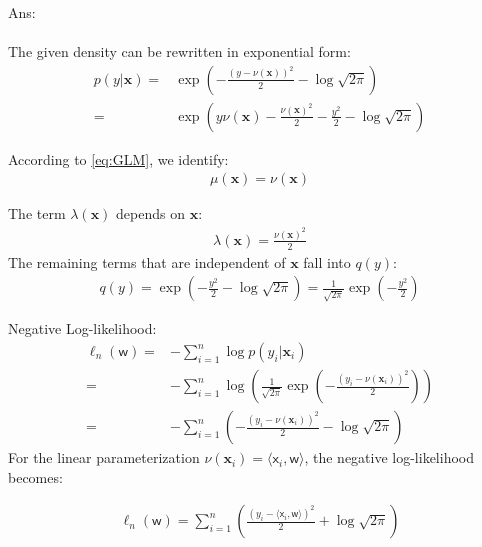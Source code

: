 \documentclass[10pt]{article}
\newcommand{\xv}{\mathbf{x}}
\newcommand{\inner}[2]{\langle #1, #2 \rangle}
\newcommand{\xbs}{\bm{\mathsf{x}}}
\newcommand{\wbs}{\bm{\mathsf{w}}}
\newcommand{\ans}[1]{{\color{orange}\textsf{Ans}: #1}}
\begin{document}
\begin{exercise}
\begin{enumerate}
          \ans\\
          \leavevmode\\
          The given density can be rewritten in exponential form:
          \begin{equation*}
            \begin{aligned}
              p(y | \xv) = & \exp\left(-\frac{(y - \nu(\xv))^2}{2} - \log \sqrt{2\pi}\right)                       \\
              =            & \exp\left(y \nu(\xv) - \frac{\nu(\xv)^2}{2} - \frac{y^2}{2} - \log \sqrt{2\pi}\right)
            \end{aligned}
          \end{equation*}

          According to \eqref{eq:GLM}, we identify:
          \begin{align}
            \boxed{\mu(\xv) = \nu(\xv)}
          \end{align}

          The term $\lambda(\xv)$ depends on $\xv$:
          \begin{align}
            \boxed{\lambda(\xv) = \frac{\nu(\xv)^2}{2} }
          \end{align}
          The remaining terms that are independent of $\xv$ fall into $q(y)$:
          \begin{align}
            \boxed{q(y) = \exp\left(-\frac{y^2}{2}-\log \sqrt{2\pi}\right)=\frac{1}{\sqrt{2\pi}}\exp\left(-\frac{y^2}{2}\right)}
          \end{align}

          Negative Log-likelihood:
          \begin{equation*}
            \begin{aligned}
              \ell_n(\wbs) = & -\sum_{i=1}^n \log p(y_i | \xv_i)                                                                      \\
              =              & -\sum_{i=1}^n \log \left(\frac{1}{\sqrt{2\pi}} \exp\left(-\frac{(y_i - \nu(\xv_i))^2}{2}\right)\right) \\
              =              & -\sum_{i=1}^n \left( -\frac{(y_i - \nu(\xv_i))^2}{2} - \log \sqrt{2\pi} \right)
            \end{aligned}
          \end{equation*}
          For the linear parameterization $\nu(\xv_i) = \inner{\xbs_i}{\wbs}$, the negative log-likelihood becomes:

          \begin{align}
            \boxed{\ell_n(\wbs) = \sum_{i=1}^n \left( \frac{(y_i - \inner{\xbs_i}{\wbs})^2}{2} + \log \sqrt{2\pi} \right)}
          \end{align}


\end{enumerate}
\end{exercise}
\end{document}
